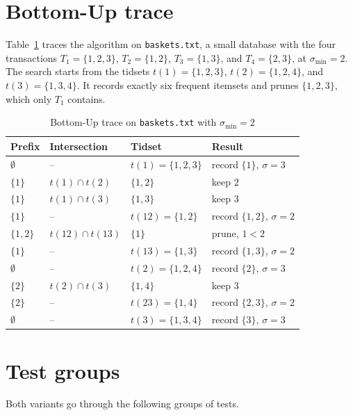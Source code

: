 \section{Bottom-Up trace}
\label{app:trace}
Table~\ref{tab:trace} traces the algorithm on \texttt{baskets.txt}, a small database with
the four transactions $T_1 = \{1,2,3\}$, $T_2 = \{1,2\}$, $T_3 = \{1,3\}$, and
$T_4 = \{2,3\}$, at $\sigma_{\min} = 2$. The search starts from the tidsets
$t(1) = \{1,2,3\}$, $t(2) = \{1,2,4\}$, and $t(3) = \{1,3,4\}$. It records exactly six
frequent itemsets and prunes $\{1,2,3\}$, which only $T_1$ contains.

\begin{table}[t]
\centering
\caption{Bottom-Up trace on \texttt{baskets.txt} with $\sigma_{\min} = 2$}
\label{tab:trace}
\begin{tabular}{llll}
\hline
Prefix & Intersection & Tidset & Result \\
\hline
$\emptyset$ & -- & $t(1) = \{1,2,3\}$ & record $\{1\}$, $\sigma = 3$ \\
$\{1\}$ & $t(1) \cap t(2)$ & $\{1,2\}$ & keep $2$ \\
$\{1\}$ & $t(1) \cap t(3)$ & $\{1,3\}$ & keep $3$ \\
$\{1\}$ & -- & $t(12) = \{1,2\}$ & record $\{1,2\}$, $\sigma = 2$ \\
$\{1,2\}$ & $t(12) \cap t(13)$ & $\{1\}$ & prune, $1 < 2$ \\
$\{1\}$ & -- & $t(13) = \{1,3\}$ & record $\{1,3\}$, $\sigma = 2$ \\
$\emptyset$ & -- & $t(2) = \{1,2,4\}$ & record $\{2\}$, $\sigma = 3$ \\
$\{2\}$ & $t(2) \cap t(3)$ & $\{1,4\}$ & keep $3$ \\
$\{2\}$ & -- & $t(23) = \{1,4\}$ & record $\{2,3\}$, $\sigma = 2$ \\
$\emptyset$ & -- & $t(3) = \{1,3,4\}$ & record $\{3\}$, $\sigma = 3$ \\
\hline
\end{tabular}
\end{table}

\section{Test groups}
\label{app:tests}
Both variants go through the following groups of tests.

